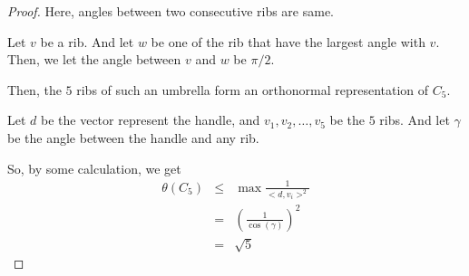 \begin{frame}
      \begin{proof}
            Here, angles between two consecutive ribs are same. 
            
            Let $v$ be a rib. And let $w$ be one of the rib that have the largest angle with $v$. Then, we let the angle between $v$ and $w$ be $ \pi/2 $.

            Then, the $5$ ribs of such an umbrella form an orthonormal representation of $C_{5}$.

            Let $d$ be the vector represent the handle, and $v_{1},v_{2},\dots,v_{5}$ be the $5$ ribs. And let $\gamma$ be the angle between the handle and any rib.

            So, by some calculation, we get
            \begin{eqnarray}
                  \theta(C_{5}) &\le& \max \frac{1}{<d,v_{i}>^{2}} \\
                  &=& \left(
                        \frac{1}{\cos(\gamma)}
                  \right)^{2} \\
                  &=& \sqrt{5}
            \end{eqnarray}
      \end{proof}
\end{frame}